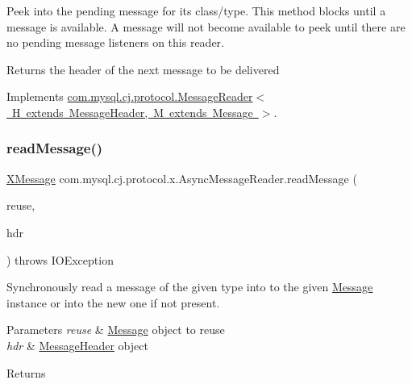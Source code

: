 Peek into the pending message for it\textquotesingle{}s class/type. This method blocks until a message is available. A message will not become available to peek until there are no pending message listeners on this reader.

\begin{DoxyReturn}{Returns}
the header of the next message to be delivered 
\end{DoxyReturn}


Implements \mbox{\hyperlink{interfacecom_1_1mysql_1_1cj_1_1protocol_1_1_message_reader_a09745b0e30f74fa13e2b32f22ce70cbb}{com.\+mysql.\+cj.\+protocol.\+Message\+Reader$<$ H extends Message\+Header, M extends Message $>$}}.

\mbox{\label{classcom_1_1mysql_1_1cj_1_1protocol_1_1x_1_1_async_message_reader_afd39b008eb7407f677e2e36f6ac640a6}} 
\subsubsection{\texorpdfstring{read\+Message()}{readMessage()}\hspace{0.1cm}{\footnotesize\ttfamily [1/2]}}
{\footnotesize\ttfamily \mbox{\hyperlink{classcom_1_1mysql_1_1cj_1_1protocol_1_1x_1_1_x_message}{X\+Message}} com.\+mysql.\+cj.\+protocol.\+x.\+Async\+Message\+Reader.\+read\+Message (\begin{DoxyParamCaption}\item[{Optional$<$ \mbox{\hyperlink{classcom_1_1mysql_1_1cj_1_1protocol_1_1x_1_1_x_message}{X\+Message}} $>$}]{reuse,  }\item[{\mbox{\hyperlink{classcom_1_1mysql_1_1cj_1_1protocol_1_1x_1_1_x_message_header}{X\+Message\+Header}}}]{hdr }\end{DoxyParamCaption}) throws I\+O\+Exception}

Synchronously read a message of the given type into to the given \mbox{\hyperlink{interfacecom_1_1mysql_1_1cj_1_1protocol_1_1_message}{Message}} instance or into the new one if not present.


\begin{DoxyParams}{Parameters}
{\em reuse} & \mbox{\hyperlink{interfacecom_1_1mysql_1_1cj_1_1protocol_1_1_message}{Message}} object to reuse \\
\hline
{\em hdr} & \mbox{\hyperlink{interfacecom_1_1mysql_1_1cj_1_1protocol_1_1_message_header}{Message\+Header}} object \\
\hline
\end{DoxyParams}
\begin{DoxyReturn}{Returns}

\end{DoxyReturn}

